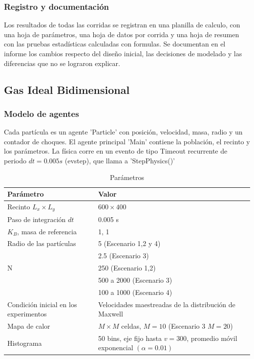 \documentclass{article}
\begin{document}
\subsubsection{Registro y documentación}
Los resultados de todas las corridas se registran en una planilla de calculo, con una hoja de parámetros, una hoja de datos por corrida y una hoja de resumen con las pruebas estadísticas calculadas con formulas. Se documentan en el informe los cambios respecto del diseño inicial, las decisiones de modelado y las diferencias que no se lograron explicar.

\subsection{Gas Ideal Bidimensional}
\subsubsection{Modelo de agentes}
Cada partícula es un agente 'Particle' con posición, velocidad, masa, radio y un contador de choques. El agente principal 'Main' contiene la población, el recinto y los parámetros. La física corre en un evento de tipo Timeout recurrente de periodo $dt=0.005s$ (ev\textunderscore step), que llama a 'StepPhysics()' 

\begin{table}[h]
\centering
\renewcommand{\arraystretch}{1.3} 
\caption{Parámetros}
\begin{tabularx}{\textwidth}{ | Y | Y | }
    \hline
    \textbf{Parámetro} & \textbf{Valor} \\
    \hline
    Recinto $L_x \times L_y$ & $600 \times 400$ \\
    \hline
    Paso de integración $dt$ & 0.005 s \\
    \hline
    $K_B$, masa de referencia & 1, 1 \\
    \hline
    Radio de las partículas & 5 (Escenario 1,2 y 4) \\  & 2.5 (Escenario 3) \\
    \hline
    N & 250 (Escenario 1,2) \\  & 500 a 2000 (Escenario 3) \\  & 100 a 1000 (Escenario 4) \\
    \hline
    Condición inicial en los experimentos & Velocidades maestreadas de la distribución de Maxwell \\
    \hline
    Mapa de calor & $M \times M$ celdas, $M=10$ (Escenario 3 $M=20$) \\
    \hline
    Histograma & 50 bins, eje fijo hasta $v=300$, promedio móvil exponencial $(\alpha=0.01)$ \\
    \hline
\end{tabularx}
\end{table}
\end{document}
